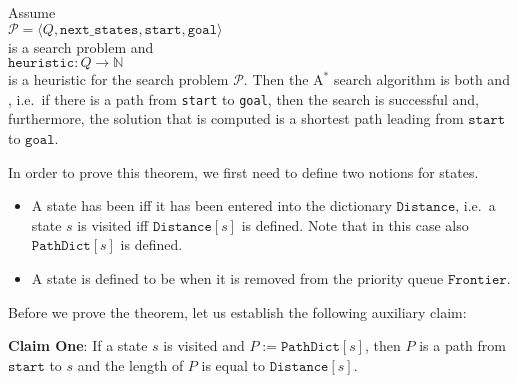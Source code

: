 \begin{Theorem} 
Assume 
\\[0.2cm]
\hspace*{1.3cm}
$\mathcal{P} = \langle Q,\mathtt{next\_states}, \mathtt{start}, \mathtt{goal}\rangle$
\\[0.2cm]
is a search problem and
\\[0.2cm]
\hspace*{1.3cm}
 $\texttt{heuristic}: Q \rightarrow \mathbb{N}$
\\[0.2cm]
is a  heuristic for the search problem $\mathcal{P}$.   Then the $\mathrm{A}^*$ search algorithm is
both  and , i.e.~if there is a path from \texttt{start} to \texttt{goal}, then the
search is successful and, furthermore, the solution that is computed is a shortest path leading from
$\texttt{start}$ to $\texttt{goal}$.
\end{Theorem}

\proof
In order to prove this theorem, we first need to define two notions for states.
\begin{itemize}
\item A state has been  iff it has been entered into the dictionary $\texttt{Distance}$, i.e.~a
      state $s$ is visited iff $\mathtt{Distance}[s]$ is defined.   Note that in this case also
      $\mathtt{PathDict}[s]$ is defined.
\item A state is defined to be 
      when it is removed from the priority queue $\texttt{Frontier}$.
\end{itemize}
Before we prove the theorem, let us establish the following auxiliary claim:
\vspace*{0.2cm}

\noindent
\textbf{Claim One}: If a state $s$ is visited and
$P := \texttt{PathDict}[s]$, then $P$ is a path from $\texttt{start}$ to $s$ and the length of
$P$ is equal to $\texttt{Distance}[s]$.  
\vspace*{0.2cm}

